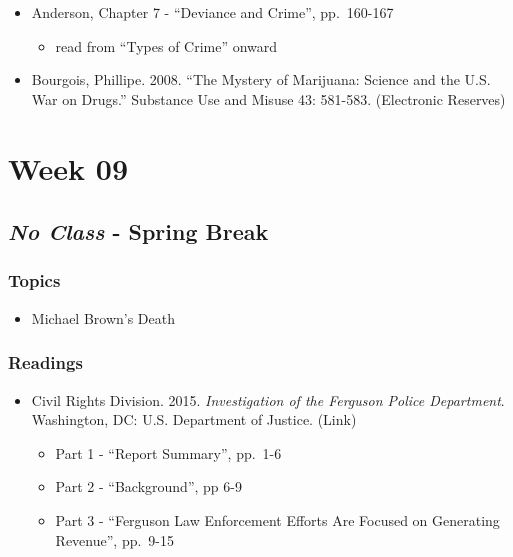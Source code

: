 \documentclass[]{book}
\providecommand{\tightlist}{%
  \setlength{\itemsep}{0pt}\setlength{\parskip}{0pt}}
\begin{document}
\begin{itemize}
\tightlist
\item
  Anderson, Chapter 7 - ``Deviance and Crime'', pp.~160-167

  \begin{itemize}
  \tightlist
  \item
    read from ``Types of Crime'' onward
  \end{itemize}
\item
  Bourgois, Phillipe. 2008. ``The Mystery of Marijuana: Science and the U.S. War on Drugs.'' Substance Use and Misuse 43: 581-583. (Electronic Reserves)
\end{itemize}

\newpage

\hypertarget{week-09}{%
\section*{Week 09}\label{week-09}}

\hypertarget{no-class---spring-break}{%
\subsection*{\texorpdfstring{\emph{No Class} - Spring Break}{No Class - Spring Break}}\label{no-class---spring-break}}

\hypertarget{topics-16}{%
\subsubsection*{Topics}\label{topics-16}}

\begin{itemize}
\tightlist
\item
  Michael Brown's Death
\end{itemize}

\hypertarget{readings-15}{%
\subsubsection*{Readings}\label{readings-15}}

\begin{itemize}
\tightlist
\item
  Civil Rights Division. 2015. \emph{Investigation of the Ferguson Police Department}. Washington, DC: U.S. Department of Justice. (Link)

  \begin{itemize}
  \tightlist
  \item
    Part 1 - ``Report Summary'', pp.~1-6
  \item
    Part 2 - ``Background'', pp 6-9
  \item
    Part 3 - ``Ferguson Law Enforcement Efforts Are Focused on Generating Revenue'', pp.~9-15
  \end{itemize}
\end{itemize}
\end{document}
